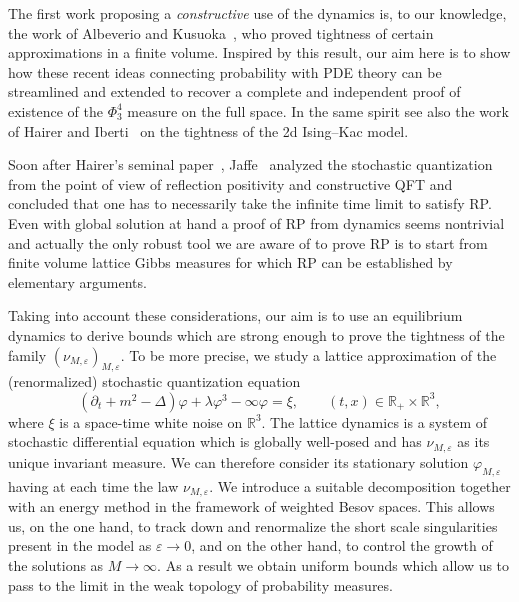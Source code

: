 \documentclass[a4paper,11pt]{article}
\newcommand{\tmtextit}[1]{{\itshape{#1}}}
\numberwithin{equation}{section}
\begin{document}
The first work proposing a \tmtextit{constructive} use of the dynamics is, to our knowledge, the work
of Albeverio and Kusuoka~{\cite{albeverio_invariant_2017}}, who proved tightness of certain approximations
in a finite volume.  Inspired by this result, our aim here is to show how these
recent ideas connecting probability with PDE theory can be streamlined and
extended to recover a complete and independent proof of
existence of the $\Phi^{4}_{3}$ measure on the full space. In the same spirit see also the work of
Hairer and Iberti~{\cite{hairer_tightness_2018}} on the tightness of the 2d
Ising--Kac model.

\medskip

Soon after Hairer's seminal paper~{\cite{hairer_theory_2014}},
Jaffe~\cite{MR3392505} analyzed the stochastic quantization from the
point of view of reflection positivity and constructive QFT and concluded that
one has to necessarily take the infinite time limit to satisfy RP. Even with
global solution at hand a proof of RP from dynamics seems nontrivial and
actually the only robust tool we are aware of to prove RP is to start from
finite volume lattice Gibbs measures for which RP can be established by elementary arguments.


Taking into account these considerations, our aim is to use an equilibrium dynamics
to derive bounds which are strong enough to prove the 
tightness of the family $(\nu_{M, \varepsilon})_{M, \varepsilon}$. To be more
precise, we study a lattice approximation of the (renormalized) stochastic
quantization equation
\begin{equation}
  (\partial_t + m^2 - \Delta) \varphi + \lambda \varphi^3 - \infty \varphi =
  \xi, \qquad (t, x) \in \mathbb{R}_+ \times \mathbb{R}^3, \label{eq:P4}
\end{equation}
where $\xi$ is a space-time white noise on $\mathbb{R}^3$. The lattice
dynamics is a system of stochastic differential equation which is globally
well-posed and has $\nu_{M, \varepsilon}$ as its unique invariant measure. We
can therefore consider its stationary solution $\varphi_{M, \varepsilon}$
having at each time the law $\nu_{M, \varepsilon}$. We introduce a suitable
decomposition together with an energy method in the framework of weighted
Besov spaces. This allows us, on the one hand, to track down and renormalize
the short scale singularities present in the model as $\varepsilon \rightarrow
0$, and on the other hand, to control the growth of the solutions as $M \to
\infty$. As a result we obtain uniform bounds  which allow us to pass to the
limit in the weak topology of probability measures.
\end{document}
